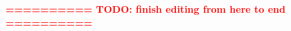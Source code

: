 \documentclass[preprint,12pt,a4paper]{elsarticle}
\begin{document}
%
%
%
%

\bigskip\bigskip\textcolor{red}{\textbf{========== TODO: finish editing from here to end ==========}}\bigskip\bigskip


\end{document}
